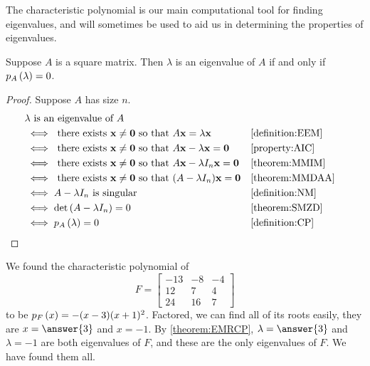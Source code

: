 \documentclass{ximera}
\begin{document}
The characteristic polynomial is our main computational tool for
finding eigenvalues, and will sometimes be used to aid us in
determining the properties of eigenvalues.

\begin{theorem}
\label{theorem:EMRCP}

Suppose $A$ is a square matrix.
Then $\lambda$ is an eigenvalue of $A$ if and only if $p_{A}\left(\lambda\right)=0$.

\begin{proof}
Suppose $A$ has size $n$.
\begin{align*}
&\text{$\lambda$ is an eigenvalue of $A$}\\
&\iff\text{ there exists $\mathbf{x}\neq\mathbf{0}$ so that $A\mathbf{x}=\lambda\mathbf{x}$}
&&\ref{definition:EEM}\\
&\iff \text{ there exists $\mathbf{x}\neq\mathbf{0}$ so that $A\mathbf{x}-\lambda\mathbf{x}=\mathbf{0}$}
&&\ref{property:AIC}\\
&\iff \text{ there exists $\mathbf{x}\neq\mathbf{0}$ so that $A\mathbf{x}-\lambda I_n\mathbf{x}=\mathbf{0}$}
&&\ref{theorem:MMIM}\\
&\iff\text{ there exists $\mathbf{x}\neq\mathbf{0}$ so that $(A-\lambda I_n)\mathbf{x}=\mathbf{0}$}
&&\ref{theorem:MMDAA}\\
&\iff A-\lambda I_n\text{ is singular}
&&\ref{definition:NM}\\
&\iff\det\left(A-\lambda I_n\right)=0
&&\ref{theorem:SMZD}\\
&\iff p_{A}\left(\lambda\right)=0
&&\ref{definition:CP}
\end{align*}

\end{proof}
\end{theorem}

\begin{example}
  We found the characteristic polynomial of
  \[
    F=
    \begin{bmatrix}
      -13 & -8 & -4\\
      12 & 7 & 4\\
      24 & 16 & 7
    \end{bmatrix}
  \]
  to be $p_{F}\left(x\right)=-(x-3)(x+1)^2$.  Factored, we can find all of
  its roots easily, they are $x=\answer{3}$ and $x=-1$.  By
  \ref{theorem:EMRCP}, $\lambda=\answer{3}$ and $\lambda=-1$ are both
  eigenvalues of $F$, and these are the only eigenvalues of $F$.  We
  have found them all.
\end{example}
\end{document}
